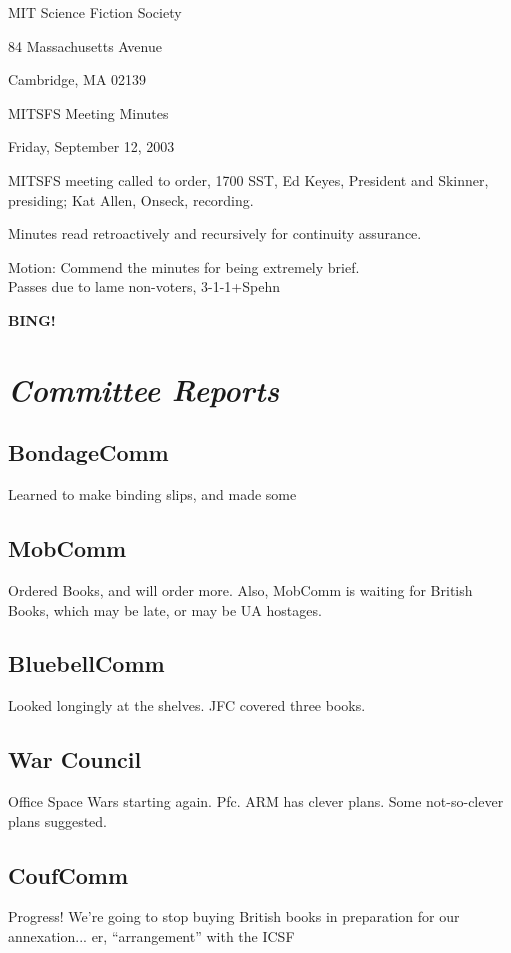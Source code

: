 \documentclass[10pt]{article}
\newcommand{\bing}{{\bf BING!} }
\newcommand{\goto}[1]{\bing \vskip 12pt \section*{{\em{#1}}}}
\begin{document}
\begin{center}

MIT Science Fiction Society 

84 Massachusetts Avenue

Cambridge, MA 02139

\vspace{12pt}

MITSFS Meeting Minutes 

Friday, September 12, 2003

\end{center}
 
\vspace{18pt}

\setlength{\parskip}{6pt}

\noindent
MITSFS meeting called to order, 1700 SST, Ed Keyes, President and
Skinner, presiding; Kat Allen,  Onseck, recording.

Minutes read retroactively and recursively for continuity assurance.

Motion: Commend the minutes for being extremely brief.\\
Passes due to lame non-voters, 3-1-1+Spehn

\goto{Committee Reports}
\subsection*{BondageComm }
Learned to make binding slips, and made some

\subsection*{MobComm}
Ordered Books, and will order more. Also, MobComm is waiting for
British Books, which may be late, or may be UA hostages.

\subsection*{BluebellComm}
Looked longingly at the shelves. JFC covered three books.

\subsection*{War Council}
Office Space Wars starting again. Pfc. ARM  has clever plans. Some
not-so-clever plans suggested.

\subsection*{CoufComm}
Progress!  We're going to stop buying British books in preparation for
our annexation... er, ``arrangement'' with the ICSF
\end{document}

